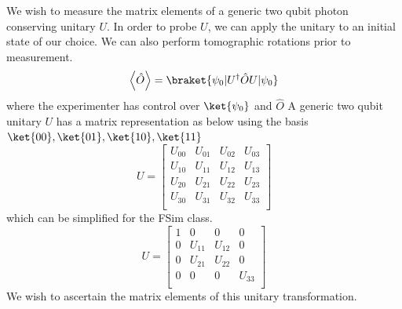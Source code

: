 We wish to measure the matrix elements of a generic two qubit photon conserving unitary $U$.
In order to probe $U$, we can apply the unitary to an initial state of our choice.  We can also perform tomographic rotations prior to measurement.
\begin{equation}
    \left< \hat{O} \right> = \braket{\psi_0 | U^{\dagger} \hat{O} U | \psi_0 }
\end{equation}
where the experimenter has control over $\ket{\psi_0}$ and $\hat{O}$
A generic two qubit unitary $U$ has a matrix representation as below using the basis $\ket{00}, \ket{01}, \ket{10}, \ket{11}$
\begin{equation}
    U =
    \begin{bmatrix}
        U_{00} & U_{01} & U_{02} & U_{03} \\
        U_{10} & U_{11} & U_{12} & U_{13} \\
        U_{20} & U_{21} & U_{22} & U_{23} \\
        U_{30} & U_{31} & U_{32} & U_{33} \\
    \end{bmatrix}
\end{equation}
which can be simplified for the FSim class.
\begin{equation}
    U=
    \begin{bmatrix}
        1 & 0 & 0 & 0 \\
        0 & U_{11} & U_{12} & 0 \\
        0 & U_{21} & U_{22} & 0 \\
        0 & 0 & 0 & U_{33} \\
    \end{bmatrix}
\end{equation}
We wish to ascertain the matrix elements of this unitary transformation.

